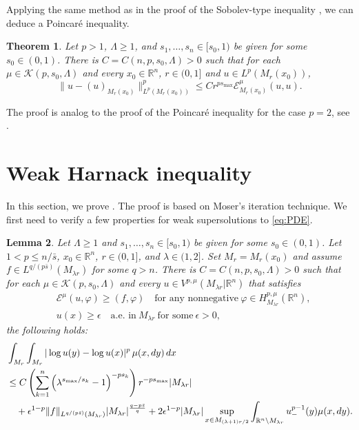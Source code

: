 \documentclass[11pt]{amsart}
\theoremstyle{plain}
\newtheorem{theorem}{Theorem}[section]
\newtheorem{lemma}[theorem]{Lemma}
\theoremstyle{definition}
\numberwithin{equation}{section}
\renewcommand{\d}{\textnormal{d}}
\newcommand{\R}{\mathbb{R}}
\newcommand{\cK}{\mathcal{K}}
\begin{document}
Applying the same method as in the proof of the Sobolev-type inequality , we can deduce a Poincar\'e inequality.
\begin{theorem}\label{thm:poincare}
Let $p> 1$, $\Lambda \ge 1$, and $s_1,\dots,s_n\in[s_0,1)$ be given for some $s_0\in(0,1)$. There is $C = C(n,p,s_0,\Lambda) > 0$ such that for each $\mu \in \cK(p,s_0,\Lambda)$ and every $x_0 \in \R^n$, $r \in (0,1]$ and $u \in L^p(M_{r}(x_0))$, 
\begin{equation*}
\|u - (u)_{M_r(x_0)}\|_{L^p(M_r(x_0))}^p \leq C r^{ps_{\max}} \mathcal{E}_{M_r(x_0)}^\mu(u,u).
\end{equation*}
\end{theorem}
The proof is analog to the proof of the Poincar\'e inequality for the case $p=2$, see \cite[Theorem 4.2]{CKW19}.

\section{Weak Harnack inequality}\label{sec:weak}
In this section, we prove . The proof is based on Moser's iteration technique. We first need to verify a few properties for weak supersolutions to \eqref{eq:PDE}.
\begin{lemma}\label{lemma:log}
Let $\Lambda \ge 1$ and $s_1,\dots,s_n\in[s_0,1)$ be given for some $s_0\in(0,1)$. Let $1<p\leq  n/\bar{s}$, $x_0 \in \R^n$, $r \in (0,1]$, and $\lambda \in (1,2]$. Set $M_r = M_r(x_0)$ and assume $f \in L^{q/(p\bar{s})}(M_{\lambda r})$ for some $q > n$. There is $C = C(n,p,s_0,\Lambda) > 0$ such that for each $\mu \in \mathcal{K}(p, s_0, \Lambda)$ and every $u \in V^{p,\mu}(M_{\lambda r} | \mathbb{R}^n)$ that satisfies
\begin{align*}
&\mathcal{E}^\mu(u, \varphi) \geq (f, \varphi) \quad \text{for any nonnegative}~ \varphi \in H^{p,\mu}_{M_{\lambda r}}(\R^n), \\
&u(x) \geq \epsilon \quad \text{a.e. in}~ M_{\lambda r} ~ \text{for some}~ \epsilon > 0,
\end{align*}
the following holds:
\begin{equation*}
\begin{split}
&\int_{M_r} \int_{M_r} |\log u(y) - \log u(x)|^p \,\mu(x,\d y) \,\d x \\
&\leq C \left( \sum_{k=1}^n \left( \lambda^{s_{\max}/s_k}-1 \right)^{-ps_k} \right) r^{-ps_{\max}} |M_{\lambda r}| \\
&\quad + \epsilon^{1-p} \|f\|_{L^{q/(p\bar{s})}(M_{\lambda r})} |M_{\lambda r}|^{\frac{q-p\bar{s}}{q}} + 2\epsilon^{1-p} |M_{\lambda r}| \sup_{x \in M_{(\lambda+1)r/2}} \int_{\mathbb{R}^n \setminus M_{\lambda r}} u_-^{p-1}(y) \mu(x, \d y).
\end{split}
\end{equation*}
\end{lemma}
\end{document}
